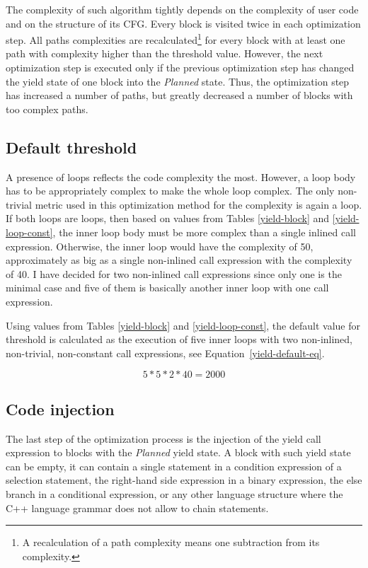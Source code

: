 The complexity of such algorithm tightly depends on the complexity of user code and on the structure of its CFG. Every block is visited twice in each optimization step. All paths complexities are recalculated\footnote{A recalculation of a path complexity means one subtraction from its complexity.} for every block with at least one path with complexity higher than the threshold value. However, the next optimization step is executed only if the previous optimization step has changed the yield state of one block into the \emph{Planned} state. Thus, the optimization step has increased a number of paths, but greatly decreased a number of blocks with too complex paths.

\subsection{Default threshold}
\label{yield-default}
A presence of loops reflects the code complexity the most. However, a loop body has to be appropriately complex to make the whole loop complex. The only non-trivial metric used in this optimization method for the complexity is again a loop. If both loops are  loops, then based on values from Tables \ref{yield-block} and \ref{yield-loop-const}, the inner loop body must be more complex than a single inlined call expression. Otherwise, the inner loop would have the complexity of 50, approximately as big as a single non-inlined call expression with the complexity of 40. I have decided for two non-inlined call expressions since only one is the minimal case and five of them is basically another inner loop with one call expression.

Using values from Tables \ref{yield-block} and \ref{yield-loop-const}, the default value for threshold is calculated as the execution of five inner  loops with two non-inlined, non-trivial, non-constant call expressions, see Equation~\ref{yield-default-eq}.

\begin{equation}
\label{yield-default-eq}
5 * 5 * 2 * 40 = 2000
\end{equation}

\subsection{Code injection}
The last step of the optimization process is the injection of the yield call expression to blocks with the \emph{Planned} yield state. A block with such yield state can be empty, it can contain a single statement in a condition expression of a selection statement, the right-hand side expression in a binary expression, the else branch in a conditional expression, or any other language structure where the C++ language grammar does not allow to chain statements.

